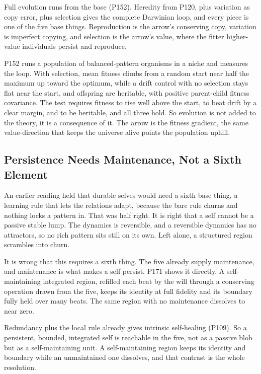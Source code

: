 Full evolution runs from the base (P152). Heredity from P120, plus variation as copy error, plus selection gives the complete Darwinian loop, and every piece is one of the five base things. Reproduction is the arrow's conserving copy, variation is imperfect copying, and selection is the arrow's value, where the fitter higher-value individuals persist and reproduce.

P152 runs a population of balanced-pattern organisms in a niche and measures the loop. With selection, mean fitness climbs from a random start near half the maximum up toward the optimum, while a drift control with no selection stays flat near the start, and offspring are heritable, with positive parent-child fitness covariance. The test requires fitness to rise well above the start, to beat drift by a clear margin, and to be heritable, and all three hold. So evolution is not added to the theory, it is a consequence of it. The arrow is the fitness gradient, the same value-direction that keeps the universe alive points the population uphill.

\subsection{Persistence Needs Maintenance, Not a Sixth Element}

An earlier reading held that durable selves would need a sixth base thing, a learning rule that lets the relations adapt, because the bare rule churns and nothing locks a pattern in. That was half right. It is right that a self cannot be a passive stable lump. The dynamics is reversible, and a reversible dynamics has no attractors, so no rich pattern sits still on its own. Left alone, a structured region scrambles into churn.

It is wrong that this requires a sixth thing. The five already supply maintenance, and maintenance is what makes a self persist. P171 shows it directly. A self-maintaining integrated region, refilled each beat by the will through a conserving operation drawn from the five, keeps its identity at full fidelity and its boundary fully held over many beats. The same region with no maintenance dissolves to near zero.

Redundancy plus the local rule already gives intrinsic self-healing (P109). So a persistent, bounded, integrated self is reachable in the five, not as a passive blob but as a self-maintaining unit. A self-maintaining region keeps its identity and boundary while an unmaintained one dissolves, and that contrast is the whole resolution.

